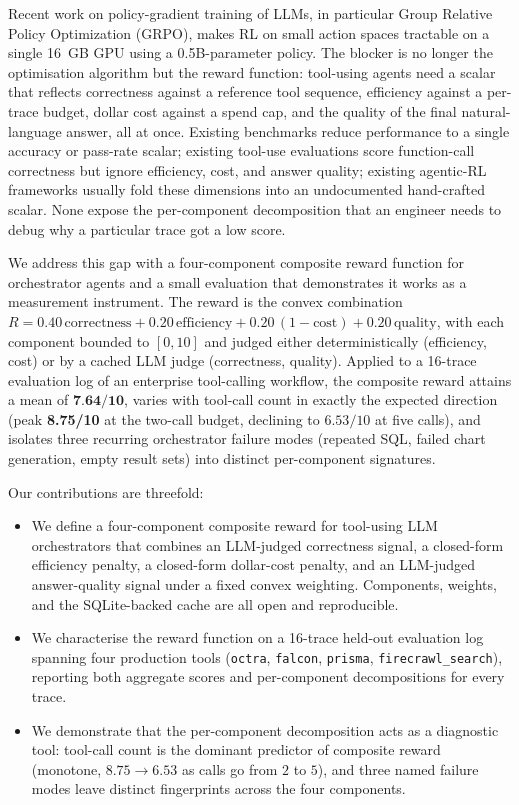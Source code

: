 \documentclass[10pt,twocolumn]{article}
\begin{document}
Recent work on policy-gradient training of LLMs, in particular Group Relative Policy Optimization (GRPO), makes RL on small action spaces tractable on a single 16~GB GPU using a 0.5B-parameter policy. The blocker is no longer the optimisation algorithm but the reward function: tool-using agents need a scalar that reflects correctness against a reference tool sequence, efficiency against a per-trace budget, dollar cost against a spend cap, and the quality of the final natural-language answer, all at once. Existing benchmarks reduce performance to a single accuracy or pass-rate scalar; existing tool-use evaluations score function-call correctness but ignore efficiency, cost, and answer quality; existing agentic-RL frameworks usually fold these dimensions into an undocumented hand-crafted scalar. None expose the per-component decomposition that an engineer needs to debug why a particular trace got a low score.

We address this gap with a four-component composite reward function for orchestrator agents and a small evaluation that demonstrates it works as a measurement instrument. The reward is the convex combination $R = 0.40\,\text{correctness} + 0.20\,\text{efficiency} + 0.20\,(1{-}\text{cost}) + 0.20\,\text{quality}$, with each component bounded to $[0, 10]$ and judged either deterministically (efficiency, cost) or by a cached LLM judge (correctness, quality). Applied to a 16-trace evaluation log of an enterprise tool-calling workflow, the composite reward attains a mean of $\textbf{7.64/10}$, varies with tool-call count in exactly the expected direction (peak \textbf{8.75/10} at the two-call budget, declining to $6.53/10$ at five calls), and isolates three recurring orchestrator failure modes (repeated SQL, failed chart generation, empty result sets) into distinct per-component signatures.

Our contributions are threefold:
\begin{itemize}
    \item We define a four-component composite reward for tool-using LLM orchestrators that combines an LLM-judged correctness signal, a closed-form efficiency penalty, a closed-form dollar-cost penalty, and an LLM-judged answer-quality signal under a fixed convex weighting. Components, weights, and the SQLite-backed cache are all open and reproducible.
    \item We characterise the reward function on a 16-trace held-out evaluation log spanning four production tools (\texttt{octra}, \texttt{falcon}, \texttt{prisma}, \texttt{firecrawl\_search}), reporting both aggregate scores and per-component decompositions for every trace.
    \item We demonstrate that the per-component decomposition acts as a diagnostic tool: tool-call count is the dominant predictor of composite reward (monotone, $8.75 \rightarrow 6.53$ as calls go from $2$ to $5$), and three named failure modes leave distinct fingerprints across the four components.
\end{itemize}
\end{document}
